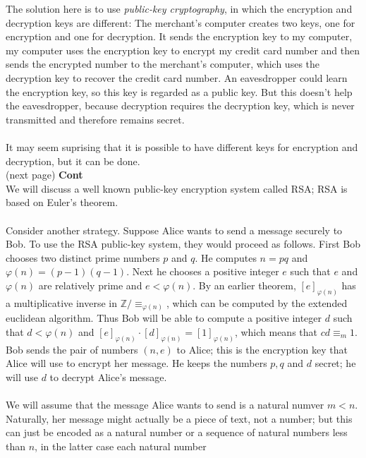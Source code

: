 \documentclass{report}
\theoremstyle{definition}
\begin{document}
The solution here is to use \textit{public-key cryptography}, in which the encryption and decryption keys are different: 
The merchant's computer creates two keys, one for encryption and one for decryption. It sends the encryption key to my computer, my computer
uses the encryption key to encrypt my credit card number and then sends the encrypted number to the merchant's computer, which uses the decryption
key to recover the credit card number. An eavesdropper could learn the encryption key, so this key is regarded as a public key. But this doesn't
help the eavesdropper, because decryption requires the decryption key, which is never transmitted and therefore remains secret.\\
\vspace{1mm}\\
It may seem suprising that it is possible to have different keys for encryption and decryption, but it can be done.\\
(next page)\newpage
\noindent\textbf{Cont}\\
We will discuss a well known public-key encryption system called RSA; RSA is based on Euler's theorem.\\
\vspace{1mm}\\
Consider another strategy. 
Suppose Alice wants to send a message securely to Bob. To use the RSA public-key system, they would proceed as follows. First Bob chooses two
distinct prime numbers $p$ and $q$. He computes $n=pq$ and $\varphi(n)=(p-1)(q-1)$. Next he chooses a positive integer $e$ such that $e$ and 
$\varphi(n)$ are relatively prime and $e<\varphi(n)$. By an earlier theorem, $[e]_{\varphi(n)}$ has a multiplicative inverse in
$\mathbb Z/\equiv_{\varphi(n)}$, which can be computed by the extended euclidean algorithm. Thus Bob will be able to compute a positive integer $d$
such that $d<\varphi(n)$ and $[e]_{\varphi(n)}\cdot[d]_{\varphi(n)}=[1]_{\varphi(n)}$, which means that $cd\equiv_m1$. Bob sends the pair of numbers
$(n,e)$ to Alice; this is the encryption key that Alice will use to encrypt her message. He keeps the numbers $p,q$ and $d$ secret; he will use $d$
to decrypt Alice's message.\\
\vspace{1mm}\\
We will assume that the message Alice wants to send is a natural numver $m<n$. Naturally, her message might actually be a piece of text, not a
number; but this can just be encoded as a natural number or a sequence of natural numbers less than $n$, in the latter case each natural number
\end{document}
